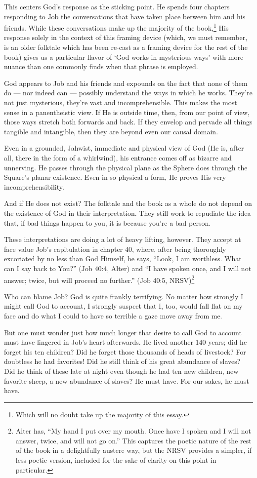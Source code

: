This centers God's response as the sticking point. He spends four chapters responding to Job the conversations that have taken place between him and his friends. While these conversations make up the majority of the book,\footnote{Which will no doubt take up the majority of this essay.} His response solely in the context of this framing device (which, we must remember, is an older folktale which has been re-cast as a framing device for the rest of the book) gives us a particular flavor of `God works in mysterious ways' with more nuance than one commonly finds when that phrase is employed.

God appears to Job and his friends and expounds on the fact that none of them do --- nor indeed can --- possibly understand the ways in which he works. They're not just mysterious, they're vast and incomprehensible. This makes the most sense in a panentheistic view. If He is outside time, then, from our point of view, those ways stretch both forwards and back. If they envelop and pervade all things tangible and intangible, then they are beyond even our causal domain.

Even in a grounded, Jahwist, immediate and physical view of God (He is, after all, there in the form of a whirlwind), his entrance comes off as bizarre and unnerving. He passes through the physical plane as the Sphere does through the Square's planar existence. Even in so physical a form, He proves His very incomprehensibility.

And if He does not exist? The folktale and the book as a whole do not depend on the existence of God in their interpretation. They still work to repudiate the idea that, if bad things happen to you, it is because you're a bad person.

These interpretations are doing a lot of heavy lifting, however. They accept at face value Job's capitulation in chapter 40, where, after being thoroughly excoriated by no less than God Himself, he says, ``Look, I am worthless. What can I say back to You?'' (Job 40:4, Alter) and ``I have spoken once, and I will not answer; twice, but will proceed no further.'' (Job 40:5, NRSV)\footnote{Alter has, ``My hand I put over my mouth. Once have I spoken and I will not answer, twice, and will not go on.'' This captures the poetic nature of the rest of the book in a delightfully austere way, but the NRSV provides a simpler, if less poetic version, included for the sake of clarity on this point in particular.}

Who can blame Job? God is quite frankly terrifying. No matter how strongly I might call God to account, I strongly suspect that I, too, would fall flat on my face and do what I could to have so terrible a gaze move away from me.

But one must wonder just how much longer that desire to call God to account must have lingered in Job's heart afterwards. He lived another 140 years; did he forget his ten children? Did he forget those thousands of heads of livestock? For doubtless he had favorites! Did he still think of his great abundance of slaves? Did he think of these late at night even though he had ten new children, new favorite sheep, a new abundance of slaves? He must have. For our sakes, he must have.
